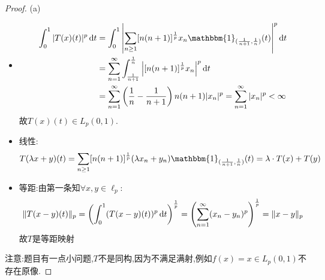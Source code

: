\begin{proof}
(a)\begin{itemize}
\item \[\begin{split}\int_0^1|T(x)(t)|^p\diff t
&=\int_0^1\left|\sum_{n\geq 1}[n(n+1)]^{\frac{1}{p}}x_n\mathbbm{1}_{(\frac{1}{n+1},\frac{1}{n})}(t)\right|^p\diff t\\
&=\sum_{n=1}^{\infty}\int_{\frac{1}{n+1}}^{\frac{1}{n}}\left|[n(n+1)]^{\frac{1}{p}}x_n\right|^p\diff t\\
&=\sum_{n=1}^{\infty}\left(\frac{1}{n}-\frac{1}{n+1}\right)n(n+1)|x_n|^p=\sum_{n=1}^{\infty}|x_n|^p<\infty
\end{split}\]
故$T(x)(t)\in L_p(0,1)$.
\item 线性:\[T(\lambda x+y)(t)=\sum_{n\geq 1}[n(n+1)]^{\frac{1}{p}}(\lambda x_n+y_n)\mathbbm{1}_{(\frac{1}{n+1},\frac{1}{n})}(t)=\lambda\cdot T(x)+T(y)\]
\item 等距:由第一条知$\forall x,y\in\ell_p$:
\[\|T(x-y)(t)\|_p=\left(\int_0^1(T(x-y)(t))^p\mathop{}\!\mathrm{d} t\right)^{\frac{1}{p}}=\left(\sum_{n=1}^{\infty}(x_n-y_n)^p\right)^{\frac{1}{p}}=\|x-y\|_p\]故$T$是等距映射
\end{itemize}
注意:题目有一点小问题,$T$不是同构,因为不满足满射,例如$f(x)=x\in L_p(0,1)$不存在原像.


\end{proof}
